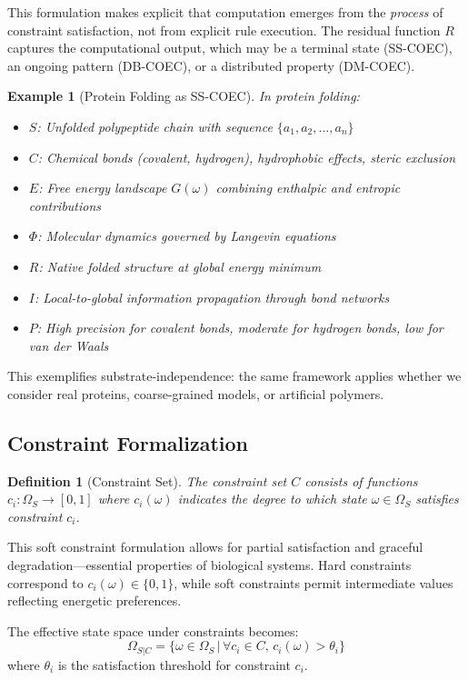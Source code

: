 \documentclass[11pt]{article}
\newtheorem{definition}{Definition}
\newtheorem{example}{Example}
\begin{document}
This formulation makes explicit that computation emerges from the \textit{process} of constraint satisfaction, not from explicit rule execution. The residual function $R$ captures the computational output, which may be a terminal state (SS-COEC), an ongoing pattern (DB-COEC), or a distributed property (DM-COEC).

\begin{example}[Protein Folding as SS-COEC]
In protein folding:
\begin{itemize}
\item $S$: Unfolded polypeptide chain with sequence $\{a_1, a_2, \ldots, a_n\}$
\item $C$: Chemical bonds (covalent, hydrogen), hydrophobic effects, steric exclusion
\item $E$: Free energy landscape $G(\omega)$ combining enthalpic and entropic contributions
\item $\Phi$: Molecular dynamics governed by Langevin equations
\item $R$: Native folded structure at global energy minimum
\item $I$: Local-to-global information propagation through bond networks
\item $P$: High precision for covalent bonds, moderate for hydrogen bonds, low for van der Waals
\end{itemize}
\end{example}

This exemplifies substrate-independence: the same framework applies whether we consider real proteins, coarse-grained models, or artificial polymers.

\subsection{Constraint Formalization}

\begin{definition}[Constraint Set]
The constraint set $C$ consists of functions $c_i: \Omega_S \to [0,1]$ where $c_i(\omega)$ indicates the degree to which state $\omega \in \Omega_S$ satisfies constraint $c_i$.
\end{definition}

This soft constraint formulation allows for partial satisfaction and graceful degradation—essential properties of biological systems. Hard constraints correspond to $c_i(\omega) \in \{0,1\}$, while soft constraints permit intermediate values reflecting energetic preferences.

The effective state space under constraints becomes:
\begin{equation}
\Omega_{S|C} = \{\omega \in \Omega_S \,|\, \forall c_i \in C, \, c_i(\omega) > \theta_i\}
\end{equation}
where $\theta_i$ is the satisfaction threshold for constraint $c_i$.
\end{document}
